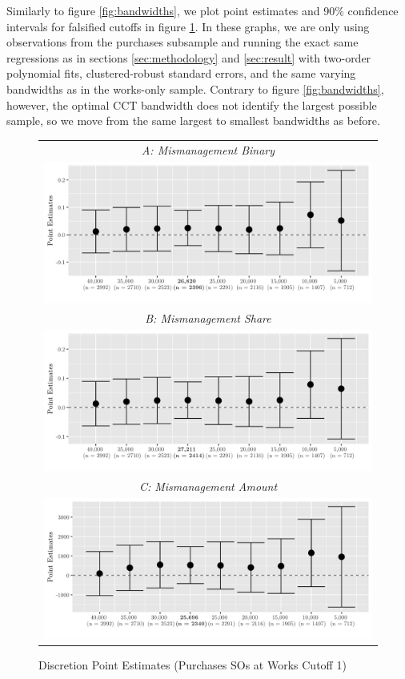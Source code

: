 \documentclass[11pt]{article}
\begin{document}
Similarly to figure \ref{fig:bandwidths}, we plot point estimates and 90\% confidence intervals for falsified cutoffs in figure \ref{fig:01falsification}. In these graphs, we are only using observations from the purchases subsample and running the exact same regressions as in sections \ref{sec:methodology} and \ref{sec:result} with two-order polynomial fits, clustered-robust standard errors, and the same varying bandwidths as in the works-only sample. Contrary to figure \ref{fig:bandwidths}, however, the optimal CCT bandwidth does not identify the largest possible sample, so we move from the same largest to smallest bandwidths as before.
\clearpage

\begin{figure}[!htbp]
  \caption{Discretion Point Estimates (Purchases SOs at Works Cutoff 1)}
  \label{fig:01falsification}
  \centering
  \small
  \begin{tabular}{c}
  \emph{A: Mismanagement Binary} \\
  \includegraphics[scale = .14]{01falsificationplot1} \\
  \emph{B: Mismanagement Share} \\
  \includegraphics[scale = .14]{01falsificationplot2} \\
  \emph{C: Mismanagement Amount} \\
  \includegraphics[scale = .14]{01falsificationplot3} \\

\end{tabular}
\end{figure}
\end{document}
